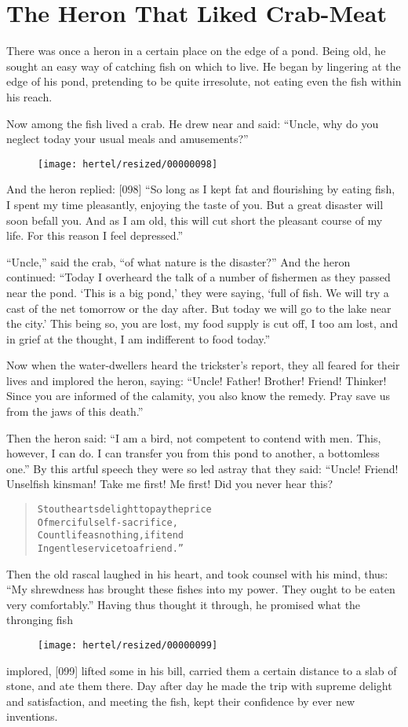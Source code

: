 \documentclass[article, twoside, 10pt]{memoir}
\renewenvironment{verbatim}{%
\begin{quote}%
\vskip -10pt%
\begin{alltt}\normalfont\small}{\end{alltt}%
\end{quote}%
\vskip -10pt
} %
\begin{document}
\chapter{The Heron That Liked Crab-Meat}

There was once a heron in a certain place on the edge of a pond.
Being old, he sought an easy way of catching fish on which to live.
He began by lingering at the edge of his pond, pretending to be
quite irresolute, not eating even the fish within his reach.

Now among the fish lived a crab. He drew near and said:
``Uncle, why do you neglect today your usual meals and amusements?''
\begin{figure}[p]\texttt{[image: hertel/resized/00000098]}\end{figure}And the heron replied: [098]
``So long as I kept fat and flourishing by eating fish, I spent my time pleasantly, enjoying the taste of you. But a great disaster will soon befall you. And as I am old, this will cut short the pleasant course of my life. For this reason I feel depressed.''

``Uncle,'' said the crab, ``of what nature is the disaster?'' And
the heron continued:
``Today I overheard the talk of a number of fishermen as they passed near the pond. `This is a big pond,' they were saying, `full of fish. We will try a cast of the net tomorrow or the day after. But today we will go to the lake near the city.' This being so, you are lost, my food supply is cut off, I too am lost, and in grief at the thought, I am indifferent to food today.''

Now when the water-dwellers heard the trickster's report, they all
feared for their lives and implored the heron, saying:
``Uncle! Father! Brother! Friend! Thinker! Since you are informed of the calamity, you also know the remedy. Pray save us from the jaws of this death.''

Then the heron said:
``I am a bird, not competent to contend with men. This, however, I can do. I can transfer you from this pond to another, a bottomless one.''
By this artful speech they were so led astray that they said:
“Uncle! Friend! Unselfish kinsman! Take me first! Me first! Did you
never hear this?

\begin{verbatim}
Stout hearts delight to pay the price
Of merciful self-sacrifice,
Count life as nothing, if it end
In gentle service to a friend.”
\end{verbatim}
Then the old rascal laughed in his heart, and took counsel with his
mind, thus:
``My shrewdness has brought these fishes into my power. They ought to be eaten very comfortably.''
Having thus thought it through, he promised what the thronging fish
\begin{figure}[p]\texttt{[image: hertel/resized/00000099]}\end{figure}implored, [099] lifted some in his bill, carried them a certain
distance to a slab of stone, and ate them there. Day after day he
made the trip with supreme delight and satisfaction, and meeting
the fish, kept their confidence by ever new inventions.
\end{document}
